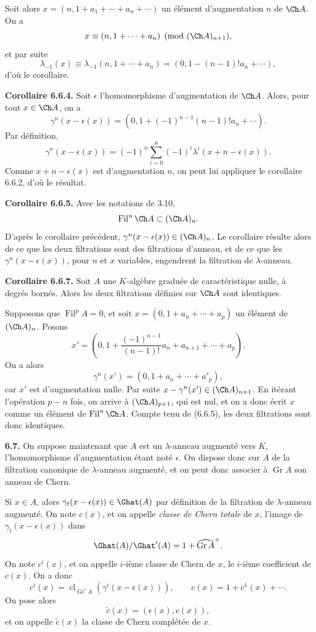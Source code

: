 \documentclass[11pt]{article}
\newcommand{\Gr}{\operatorname{Gr}}
\newcommand{\Fil}{\operatorname{Fil}}
\newcommand{\cl}{\operatorname{cl}}
\providecommand{\Gr}{\operatorname{Gr}}
\providecommand{\Gr}{\operatorname{G}}
\begin{document}
Soit alors \(x=(n,1+a_1+\cdots+a_n+\cdots)\) un élément d'augmentation \(n\) de \(\Ch A\). On a
\[
  x\equiv (n,1+\cdots+a_n)\pmod{(\Ch A)_{n+1}},
\]
et par suite
\[
  \lambda_{-1}(x)\equiv\lambda_{-1}(n,1+\cdots+a_n)
  =(0,1-(n-1)!a_n+\cdots),
\]
d'où le corollaire.

\textbf{Corollaire 6.6.4.} Soit \(\epsilon\) l'homomorphisme d'augmentation de \(\Ch A\). Alors, pour tout \(x\in\Ch A\), on a
\[
  \gamma^n(x-\epsilon(x))
  =
  (0,1+(-1)^{n-1}(n-1)!a_n+\cdots).
\]
Par définition,
\[
  \gamma^n(x-\epsilon(x))
  =
  (-1)^n\sum_{i=0}^n(-1)^i\lambda^i(x+n-\epsilon(x)).
\]
Comme \(x+n-\epsilon(x)\) est d'augmentation \(n\), on peut lui appliquer le corollaire 6.6.2, d'où le résultat.

\textbf{Corollaire 6.6.5.} Avec les notations de 3.10,
\[
  \Fil^n\Ch A\subset(\Ch A)_n.
\]
D'après le corollaire précédent, \(\gamma^n(x-\epsilon(x))\in(\Ch A)_n\). Le corollaire résulte alors de ce que les deux filtrations sont des filtrations d'anneau, et de ce que les \(\gamma^n(x-\epsilon(x))\), pour \(n\) et \(x\) variables, engendrent la filtration de \(\lambda\)-anneau.

\textbf{Corollaire 6.6.7.} Soit \(A\) une \(K\)-algèbre graduée de caractéristique nulle, à degrés bornés. Alors les deux filtrations définies sur \(\Ch A\) sont identiques.

Supposons que \(\Fil^pA=0\), et soit \(x=(0,1+a_n+\cdots+a_p)\) un élément de \((\Ch A)_n\). Posons
\[
  x'=\left(0,1+\frac{(-1)^{n-1}}{(n-1)!}a_n+a_{n+1}+\cdots+a_p\right).
\]
On a alors
\[
  \gamma^n(x')=(0,1+a_n+\cdots+a'_p),
\]
car \(x'\) est d'augmentation nulle. Par suite \(x-\gamma^n(x')\in(\Ch A)_{n+1}\). En itérant l'opération \(p-n\) fois, on arrive à \((\Ch A)_{p+1}\), qui est nul, et on a donc écrit \(x\) comme un élément de \(\Fil^n\Ch A\). Compte tenu de (6.6.5), les deux filtrations sont donc identiques.

\textbf{6.7.} On suppose maintenant que \(A\) est un \(\lambda\)-anneau augmenté vers \(K\), l'homomorphisme d'augmentation étant noté \(\epsilon\). On dispose donc sur \(A\) de la filtration canonique de \(\lambda\)-anneau augmenté, et on peut donc associer à \(\Gr A\) son anneau de Chern.

Si \(x\in A\), alors \(\gamma_t(x-\epsilon(x))\in\Ghat(A)\) par définition de la filtration de \(\lambda\)-anneau augmenté. On note \(c(x)\), et on appelle \emph{classe de Chern totale} de \(x\), l'image de \(\gamma_t(x-\epsilon(x))\) dans
\[
  \Ghat(A)/\Ghat'(A)=1+\widehat{\Gr A}^{+}.
\]
On note \(c^i(x)\), et on appelle \(i\)-ième classe de Chern de \(x\), le \(i\)-ième coefficient de \(c(x)\). On a donc
\begin{equation}\tag{6.7.1}
  c^i(x)=\cl_{\Gr^iA}\!\left(\gamma^i(x-\epsilon(x))\right),
  \qquad
  c(x)=1+c^1(x)+\cdots .
\end{equation}
On pose alors
\begin{equation}\tag{6.7.2}
  \widetilde c(x)=(\epsilon(x),c(x)),
\end{equation}
et on appelle \(\widetilde c(x)\) la classe de Chern complétée de \(x\).
\end{document}
